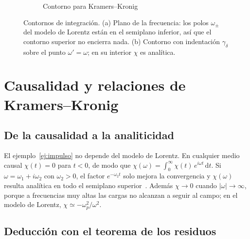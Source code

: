 \documentclass[11pt,letterpaper]{article}
\newcounter{ejemplo}
\newcommand{\dd}{\mathrm{d}}
\begin{document}
\begin{figure}[t]
\begin{subfigure}[b]{0.46\textwidth}
    \caption{Contorno para Kramers--Kronig}
  \end{subfigure}
  \caption{Contornos de integración. (a) Plano de la frecuencia: los polos
  $\omega_\pm$ del modelo de Lorentz están en el semiplano inferior, así que el
  contorno superior no encierra nada. (b) Contorno con indentación
  $\gamma_\delta$ sobre el punto $\omega'=\omega$; en su interior $\chi$ es
  analítica.}
  \label{fig:contornos}
\end{figure}

\section{Causalidad y relaciones de Kramers--Kronig}\label{sec:kk}

\subsection{De la causalidad a la analiticidad}

El ejemplo~\ref{ej:impulso} no depende del modelo de Lorentz. En cualquier
medio causal $\chi(t)=0$ para $t<0$, de modo que
$\chi(\omega)=\int_0^\infty\chi(t)\,e^{i\omega t}\,\dd t$. Si
$\omega=\omega_1+i\omega_2$ con $\omega_2>0$, el factor $e^{-\omega_2t}$ solo
mejora la convergencia y $\chi(\omega)$ resulta analítica en todo el semiplano
superior~\cite{Toll}. Además $\chi\to0$ cuando $|\omega|\to\infty$, porque a
frecuencias muy altas las cargas no alcanzan a seguir al campo; en el modelo
de Lorentz, $\chi\simeq-\omega_p^2/\omega^2$.

\subsection{Deducción con el teorema de los residuos}
\end{document}
